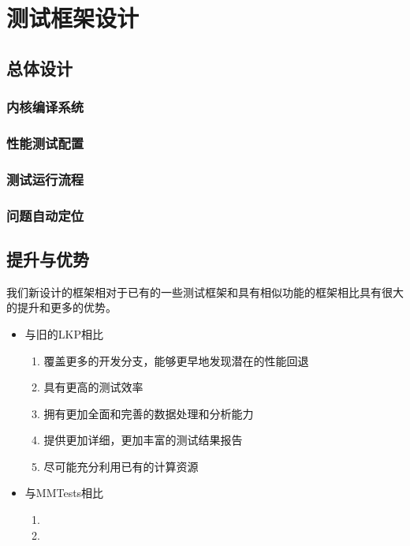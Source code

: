 

\chapter{测试框架设计}


\section{总体设计}

\subsection{内核编译系统}

\subsection{性能测试配置}

\subsection{测试运行流程}

\subsection{问题自动定位}


\section{提升与优势}

我们新设计的框架相对于已有的一些测试框架和具有相似功能的框架相比具有很大的提升和更多的优势。

\begin{itemize}
\item 与旧的LKP相比

\begin{enumerate}
\item 覆盖更多的开发分支，能够更早地发现潜在的性能回退
\item 具有更高的测试效率
\item 拥有更加全面和完善的数据处理和分析能力
\item 提供更加详细，更加丰富的测试结果报告
\item 尽可能充分利用已有的计算资源
\end{enumerate}

\item 与MMTests相比

\begin{enumerate}
\item 
\item 
\end{enumerate}

\end{itemize}